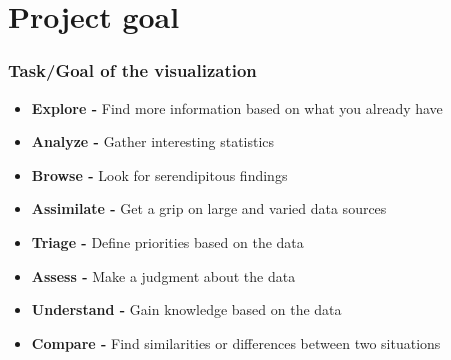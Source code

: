 
\section{Project goal}

  \begin{frame}
    \frametitle{Task/Goal of the visualization}
    \begin{itemize}
        \item \textbf{Explore -} Find more information based on what you already have
        \item \textbf{Analyze -} Gather interesting statistics
        \item \textbf{Browse -} Look for serendipitous findings
        \item \textbf{Assimilate -} Get a grip on large and varied data sources
        \item \textbf{Triage -} Define priorities based on the data
        \item \textbf{Assess -} Make a judgment about the data
        \item \textbf{Understand -} Gain knowledge based on the data
        \item \textbf{Compare -} Find similarities or differences between two situations
    \end{itemize}
  \end{frame}






